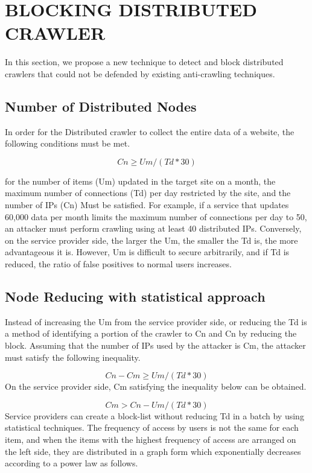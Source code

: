 \documentclass[sigconf,anonymous=false]{acmart}
\begin{document}
%
%
\section{BLOCKING DISTRIBUTED CRAWLER}
In this section, we propose a new technique to detect and block distributed crawlers that could not be defended by existing anti-crawling techniques.

\subsection{Number of Distributed Nodes}
In order for the Distributed crawler to collect the entire data of a website, the following conditions must be met. 

  \begin{displaymath}
Cn \geq Um / (Td * 30) 
  \end{displaymath}


for the number of items (Um) updated in the target site on a month, the maximum number of connections (Td) per day restricted by the site, and the number of IPs (Cn) Must be satisfied.
For example, if a service that updates 60,000 data per month limits the maximum number of connections per day to 50, an attacker must perform crawling using at least 40 distributed IPs. Conversely, on the service provider side, the larger the Um, the smaller the Td is, the more advantageous it is. However, Um is difficult to secure arbitrarily, and if Td is reduced, the ratio of false positives to normal users increases.


\subsection{Node Reducing with statistical approach}
Instead of increasing the Um from the service provider side, or reducing the Td is a method of identifying a portion of the crawler to Cn and Cn by reducing the block.
Assuming that the number of IPs used by the attacker is Cm, the attacker must satisfy the following inequality.

  \begin{displaymath}
Cn - Cm \geq Um / (Td * 30)
  \end{displaymath}\newline
On the service provider side, Cm satisfying the inequality below can be obtained.

  \begin{displaymath}
Cm > Cn - Um / (Td * 30)
  \end{displaymath}\newline
Service providers can create a block-list without reducing Td in a batch by using statistical techniques. The frequency of access by users is not the same for each item, and when the items with the highest frequency of access are arranged on the left side, they are distributed in a graph form which exponentially decreases according to a power law as follows.
\end{document}
